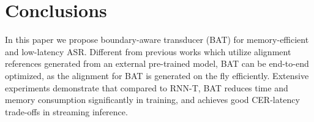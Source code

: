 \documentclass{INTERSPEECH2023}
\begin{document}
\section{Conclusions}
In this paper we propose boundary-aware transducer (BAT) for memory-efficient and low-latency ASR. Different from previous works which utilize alignment references generated from an external pre-trained model, BAT can be end-to-end optimized, as the alignment for BAT is generated on the fly efficiently. Extensive experiments demonstrate that compared to RNN-T, BAT reduces time and memory consumption significantly in training, and achieves good CER-latency trade-offs in streaming inference.



\end{document}
